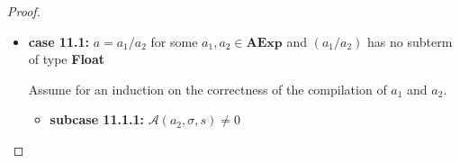 \documentclass{article}
\begin{document}
\begin{proof}
\begin{itemize}
    \[
      \begin{aligned}
        \langle  \mathcal{CA}(a) : c,\, e,\, \sigma,\, s,\, pc \rangle 
        &= \langle \mathcal{CA}(a_1 - a_2) : c,\, e,\, \sigma,\, s,\, pc \rangle \\
        &= \langle \mathcal{CA}(a_2) : \mathcal{CA}(a_1) : \texttt{SUB} :  c,\, e,\, \sigma,\, s,\, pc \rangle 
        && \text{(definition of $\mathcal{CA}$)} \\
        &\triangleright^{\ast} \langle \mathcal{CA}(a_1) : \texttt{SUB} :  c,\, \mathcal{A}(a_2, \sigma, s) : e,\, \sigma,\, s,\, pc + l_2 \rangle 
        && \text{(induction hypothesis 2)} \\
        &\triangleright^{\ast} \langle \texttt{SUB} :  c,\, \mathcal{A}(a_1, \sigma, s) : \mathcal{A}(a_2, \sigma, s) : e,\, \sigma,\, s,\, pc + l_2 + l_1 \rangle 
        && \text{(induction hypothesis 1)} \\
        &\triangleright \langle c,\, (\mathcal{A}(a_1, \sigma, s) - \mathcal{A}(a_2, \sigma, s)) : e,\, \sigma,\, s,\, pc + l_2 + l_1 + 1 \rangle 
        && \text{(operational semantics)} \\
        &= \langle c,\, \mathcal{A}(a_1 - a_2, \sigma, s) : e,\, \sigma,\, s,\, pc + l_2 + l_1 + 1 \rangle
        && \text{(definition of $\mathcal{A}$)} \\
        &= \langle c,\, \mathcal{A}(a, \sigma, s) : e,\, \sigma,\, s,\, pc + l_2 + l_1 + 1 \rangle \\
      \end{aligned}
  \]

    \item \textbf{case 11.1: } $a = a_1 / a_2$ for some $a_1, a_2 \in \textbf{AExp}$ and $(a_1 / a_2)$ has no subterm of type \textbf{Float}

    Assume for an induction on the correctness of the compilation of $a_1$ and $a_2$.

        \begin{itemize}
            \item \textbf{subcase 11.1.1: } $\mathcal{A}(a_2, \sigma, s) \neq 0$


\end{itemize}
\end{itemize}
\end{proof}
\end{document}
